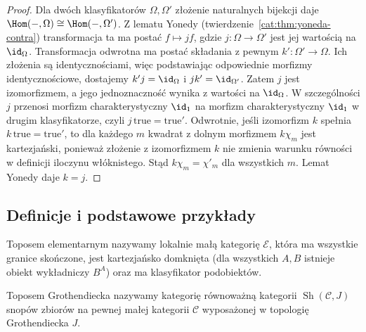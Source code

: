 \begin{proof}
Dla dwóch klasyfikatorów $\Omega,\Omega'$ złożenie naturalnych bijekcji daje $\Hom(-,\Omega)\cong\Hom(-,\Omega')$. Z lematu Yonedy (twierdzenie~\ref{cat:thm:yoneda-contra}) transformacja ta ma postać $f\mapsto jf$, gdzie $j:\Omega\to\Omega'$ jest jej wartością na $\id_\Omega$. Transformacja odwrotna ma postać składania z pewnym $k':\Omega'\to\Omega$. Ich złożenia są identycznościami, więc podstawiając odpowiednie morfizmy identycznościowe, dostajemy $k'j=\id_\Omega$ i $jk'=\id_{\Omega'}$. Zatem $j$ jest izomorfizmem, a jego jednoznaczność wynika z wartości na $\id_\Omega$. W szczególności $j$ przenosi morfizm charakterystyczny $\id_1$ na morfizm charakterystyczny $\id_1$ w drugim klasyfikatorze, czyli $j\,\mathrm{true}=\mathrm{true}'$. Odwrotnie, jeśli izomorfizm $k$ spełnia $k\,\mathrm{true}=\mathrm{true}'$, to dla każdego $m$ kwadrat z dolnym morfizmem $k\chi_m$ jest kartezjański, ponieważ złożenie z izomorfizmem $k$ nie zmienia warunku równości w definicji iloczynu włóknistego. Stąd $k\chi_m=\chi'_m$ dla wszystkich $m$. Lemat Yonedy daje $k=j$.
\end{proof}

\subsection{Definicje i podstawowe przykłady}

\begin{definicja}\label{cat:def:elementary-topos}
Toposem elementarnym nazywamy lokalnie małą kategorię $\mathcal E$, która ma wszystkie granice skończone, jest kartezjańsko domknięta (dla wszystkich $A,B$ istnieje obiekt wykładniczy $B^A$) oraz ma klasyfikator podobiektów.
\end{definicja}

\begin{definicja}\label{cat:def:grothendieck-topos}
Toposem Grothendiecka nazywamy kategorię równoważną kategorii $\operatorname{Sh}(\mathcal C,J)$ snopów zbiorów na pewnej małej kategorii $\mathcal C$ wyposażonej w topologię Grothendiecka $J$.
\end{definicja}

